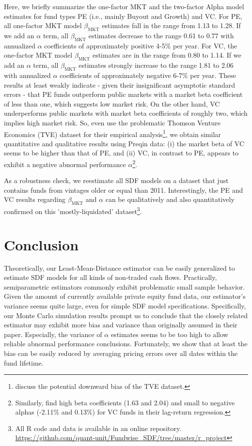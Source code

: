 \documentclass[12pt]{article}
\begin{document}
Here, we briefly summarize the one-factor MKT and the two-factor Alpha model estimates for fund types PE (i.e., mainly Buyout and Growth) and VC.
For PE, all one-factor MKT model $\beta_{\mathrm{MKT}}$ estimates fall in the range from 1.13 to 1.28. 
If we add an $\alpha$ term, all $\beta_{\mathrm{MKT}}$ estimates decrease to the range 0.61 to 0.77 with annualized $\alpha$ coefficients of approximately positive 4-5\% per year.
For VC, the one-factor MKT model $\beta_{\mathrm{MKT}}$ estimates are in the range from 0.80 to 1.14.
If we add an $\alpha$ term, all $\beta_{\mathrm{MKT}}$ estimates strongly increase to the range 1.81 to 2.06 with annualized $\alpha$ coefficients of approximately negative 6-7\% per year.
These results at least weakly indicate - given their insignificant asymptotic standard errors - that PE funds outperform public markets with a market beta coefficient of less than one, which suggests low market risk.
On the other hand, VC underperforms public markets with market beta coefficients of roughly two, which implies high market risk.
So, even \cite{DLP12} use the problematic Thomson Venture Economics (TVE) dataset for their empirical analysis\footnote{\cite{HJK14} discuss the potential downward bias of the TVE dataset.}, we obtain similar quantitative and qualitative results using Preqin data: (i) the market beta of VC seems to be higher than that of PE, and (ii) VC, in contrast to PE, appears to exhibit a negative abnormal performance $\alpha$\footnote{Similarly, \cite[Exhibit 4.6]{MY10} find high beta coefficients (1.63 and 2.04) and small to negative alphas (-2.11\% and 0.13\%) for VC funds in their lag-return regression.}.

As a robustness check, we reestimate all SDF models on a dataset that just contains funds from vintages older or equal than 2011.
Interestingly, the PE and VC results regarding $\beta_{\mathrm{MKT}}$ and $\alpha$ can be qualitatively and also quantitatively confirmed on this 'mostly-liquidated' dataset\footnote{All R code and data is available in an online repository. \url{https://github.com/quant-unit/Fundwise_SDF/tree/master/r_project}
}.

\section{Conclusion}
\label{sec:spatial_sdf_conclusion}

Theoretically, our Least-Mean-Distance estimator can be easily generalized to estimate SDF models for all kinds of non-traded cash flows.
Practically, semiparametric estimators commonly exhibit problematic small sample behavior.
Given the amount of currently available private equity fund data, our estimator's variance seems quite large, even for simple SDF model specifications.
Specifically, our Monte Carlo simulation results prompt us to conclude that the closely related \cite{DLP12} estimator may exhibit more bias and variance than originally assumed in their paper.
Especially, the variance of $\alpha$ estimates seems to be too high to allow reliable abnormal performance conclusions.
Fortunately, we show that at least the bias can be easily reduced by averaging pricing errors over all dates within the fund lifetime.
\end{document}

